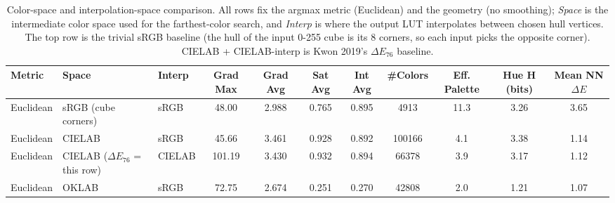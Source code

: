 \begin{table}[H]
\small
\begin{tabular}{@{}lllcccccccc@{}}
\toprule
\textbf{Metric} & \textbf{Space} & \textbf{Interp} & \textbf{Grad Max} & \textbf{Grad Avg} & \textbf{Sat Avg} & \textbf{Int Avg} & \textbf{\#Colors} & \textbf{Eff. Palette} & \textbf{Hue H (bits)} & \textbf{Mean NN $\Delta E$}\\
\midrule
Euclidean & sRGB (cube corners) & sRGB & 48.00 & 2.988 & 0.765 & 0.895 & 4913 & 11.3 & 3.26 & 3.65\\
Euclidean & CIELAB & sRGB & 45.66 & 3.461 & 0.928 & 0.892 & 100166 & 4.1 & 3.38 & 1.14\\
Euclidean & CIELAB ($\Delta E_{76}$ = this row) & CIELAB & 101.19 & 3.430 & 0.932 & 0.894 & 66378 & 3.9 & 3.17 & 1.12\\
Euclidean & OKLAB & sRGB & 72.75 & 2.674 & 0.251 & 0.270 & 42808 & 2.0 & 1.21 & 1.07\\
\bottomrule
\end{tabular}
\caption{Color-space and interpolation-space comparison. All rows fix the argmax metric (Euclidean) and the geometry (no smoothing); \emph{Space} is the intermediate color space used for the farthest-color search, and \emph{Interp} is where the output LUT interpolates between chosen hull vertices. The top row is the trivial sRGB baseline (the hull of the input 0-255 cube is its 8 corners, so each input picks the opposite corner). CIELAB + CIELAB-interp is Kwon 2019's $\Delta E_{76}$ baseline.}
\label{tab:space_and_interp}
\end{table}
